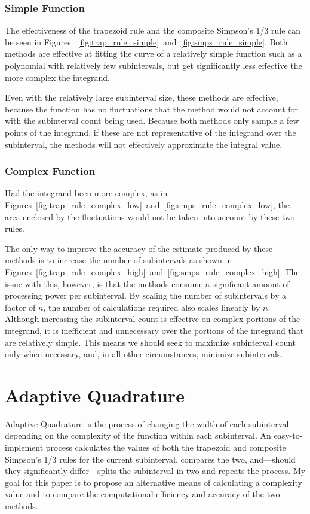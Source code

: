 \documentclass{paper}
\begin{document}
\subsubsection{Simple Function}
The effectiveness of the trapezoid rule and the composite Simpson's 1/3 rule can be seen in Figures~ \ref{fig:trap_rule_simple}~and~\ref{fig:smps_rule_simple}.
Both methods are effective at fitting the curve of a relatively simple function such as a polynomial with relatively few subintervals, but get significantly less effective the more complex the integrand.
%


%
Even with the relatively large subinterval size, these methods are effective, because the function has no fluctuations that the method would not account for with the subinterval count being used.
Because both methods only sample a few points of the integrand, if these are not representative of the integrand over the subinterval, the methods will not effectively approximate the integral value.

\subsubsection{Complex Function}
Had the integrand been more complex, as in Figures~\ref{fig:trap_rule_complex_low}~and~\ref{fig:smps_rule_complex_low}, the area enclosed by the fluctuations would not be taken into account by these two rules.
%


%
The only way to improve the accuracy of the estimate produced by these methods is to increase the number of subintervals as shown in Figures~\ref{fig:trap_rule_complex_high}~and~\ref{fig:smps_rule_complex_high}.
The issue with this, however, is that the methods consume a significant amount of processing power per subinterval.
By scaling the number of subintervals by a factor of \(n\), the number of calculations required also scales linearly by \(n\).
%
% 
% 
%
Although increasing the subinterval count is effective on complex portions of the integrand, it is inefficient and unnecessary over the portions of the integrand that are relatively simple.
This means we should seek to maximize subinterval count only when necessary, and, in all other circumstances, minimize subintervals.

\section{Adaptive Quadrature}
Adaptive Quadrature is the process of changing the width of each subinterval depending on the complexity of the function within each subinterval.
An easy-to-implement process calculates the values of both the trapezoid and composite Simpson's 1/3 rules for the current subinterval, compares the two, and---should they significantly differ---splits the subinterval in two and repeats the process. %
My goal for this paper is to propose an alternative means of calculating a complexity value and to compare the computational efficiency and accuracy of the two methods.
\end{document}
